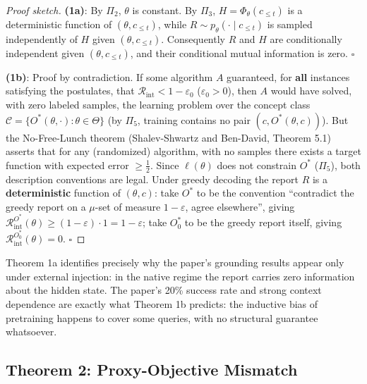 \begin{proof}[Proof sketch]
\textbf{(1a)}: By $\Pi_2$, $\theta$ is constant. By $\Pi_3$, $H = \Phi_\theta(c_{\le t})$ is a
deterministic function of $(\theta, c_{\le t})$, while $R \sim p_\theta(\cdot\mid c_{\le t})$
is sampled independently of $H$ given $(\theta, c_{\le t})$. Consequently $R$ and $H$ are
conditionally independent given $(\theta, c_{\le t})$, and their conditional mutual
information is zero. $\square$

\textbf{(1b)}: Proof by contradiction. If some algorithm $A$ guaranteed, for \textbf{all}
instances satisfying the postulates, that $\mathcal{R}_{\mathrm{int}} < 1 - \varepsilon_0$
($\varepsilon_0 > 0$), then $A$ would have solved, with zero labeled samples, the learning
problem over the concept class $\mathcal{C} = \{ O^{*}(\theta, \cdot) : \theta \in \Theta \}$
(by $\Pi_5$, training contains no pair $(c, O^{*}(\theta,c))$). But the No-Free-Lunch theorem
(Shalev-Shwartz and Ben-David, Theorem 5.1\cite{shalev-shwartz-2014}) asserts that for any
(randomized) algorithm, with no samples there exists a target function with expected error
$\ge \tfrac12$. Since $\ell(\theta)$ does not constrain $O^{*}$ ($\Pi_5$), both description
conventions are legal. Under greedy decoding the report $R$ is a \textbf{deterministic}
function of $(\theta,c)$: take $O^{*}$ to be the convention ``contradict the greedy report on a
$\mu$-set of measure $1-\varepsilon$, agree elsewhere'', giving
$\mathcal{R}_{\mathrm{int}}^{O^{*}}(\theta) \ge (1-\varepsilon) \cdot 1 = 1-\varepsilon$;
take $O^{*}_0$ to be the greedy report itself, giving
$\mathcal{R}_{\mathrm{int}}^{O^{*}_0}(\theta) = 0$. $\square$
\end{proof}

\begin{remark}
Theorem 1a identifies precisely why the paper's grounding results appear only under external
injection: in the native regime the report carries zero information about the hidden state.
The paper's 20\% success rate and strong context dependence are exactly what Theorem 1b
predicts: the inductive bias of pretraining happens to cover some queries, with no
structural guarantee whatsoever.
\end{remark}

\subsection{Theorem 2: Proxy-Objective Mismatch}

